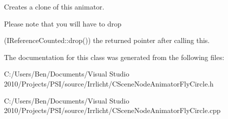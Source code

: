 Creates a clone of this animator. 

\begin{DoxyVerb}Please note that you will have to drop
\end{DoxyVerb}
 (I\-Reference\-Counted\-::drop()) the returned pointer after calling this. 

The documentation for this class was generated from the following files\-:\begin{DoxyCompactItemize}
\item 
C\-:/\-Users/\-Ben/\-Documents/\-Visual Studio 2010/\-Projects/\-P\-S\-I/source/\-Irrlicht/C\-Scene\-Node\-Animator\-Fly\-Circle.\-h\item 
C\-:/\-Users/\-Ben/\-Documents/\-Visual Studio 2010/\-Projects/\-P\-S\-I/source/\-Irrlicht/C\-Scene\-Node\-Animator\-Fly\-Circle.\-cpp\end{DoxyCompactItemize}
